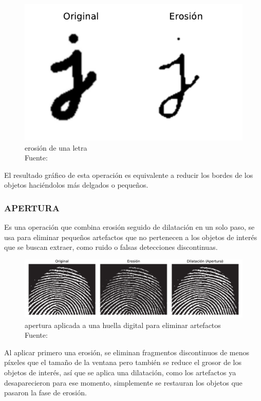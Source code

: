 				\begin{figure}[H]
					\centering
					\includegraphics[scale=0.7]{imagenes/erosion}
					\caption[Erosión de una letra]{erosión de una letra\\Fuente: \citep{szeliski}}
				\end{figure}
				
				El resultado gráfico de esta operación es equivalente a reducir los bordes de los objetos haciéndolos más delgados o pequeños.
			\subsubsection{APERTURA}
				Es una operación que combina erosión seguido de dilatación en un solo paso, se usa para eliminar pequeños artefactos que no pertenecen a los objetos de interés que se buscan extraer, como ruido o falsas detecciones discontinuas.
				
				\begin{figure}[H]
					\centering
					\includegraphics[scale=0.4]{imagenes/apertura}
					\caption[Apertura aplicada a una huella digital]{apertura aplicada a una huella digital para eliminar artefactos\\Fuente: \citep{gonzalez}}
				\end{figure}
				
				Al aplicar primero una erosión, se eliminan fragmentos discontinuos de menos píxeles que el tamaño de la ventana pero también se reduce el grosor de los objetos de interés, así que se aplica una dilatación, como los artefactos ya desaparecieron para ese momento, simplemente se restauran los objetos que pasaron la fase de erosión.
